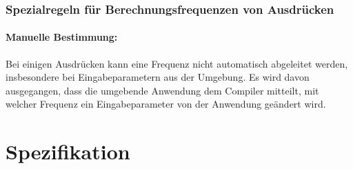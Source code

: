 \subsubsection{Spezialregeln für Berechnungsfrequenzen von Ausdrücken}

\paragraph{Manuelle Bestimmung:}
Bei einigen Ausdrücken kann eine Frequenz nicht automatisch abgeleitet werden, insbesondere bei Eingabeparametern aus der
Umgebung. Es wird davon ausgegangen, dass die umgebende Anwendung dem Compiler mitteilt, mit welcher Frequenz ein Eingabeparameter
von der Anwendung geändert wird.\\



\newpage
\section{Spezifikation}

